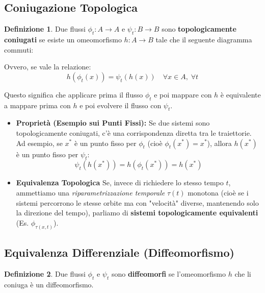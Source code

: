 \documentclass[openany]{book}
\theoremstyle{definition}
\newtheorem*{definizione}{Definizione}
\theoremstyle{remark}
\begin{document}
\subsection*{Coniugazione Topologica}
\begin{definizione}
Due flussi $\phi_t : A \to A$ e $\psi_t : B \to B$ sono \textbf{topologicamente coniugati} se esiste un omeomorfismo $h : A \to B$ tale che il seguente diagramma commuti:

\begin{center}
\end{center}

Ovvero, se vale la relazione:
\begin{equation}
h(\phi_t(x)) = \psi_t(h(x)) \quad \forall x \in A, \;\forall t
\end{equation}
\end{definizione}

Questo significa che applicare prima il flusso $\phi_t$ e poi mappare con $h$ è equivalente a mappare prima con $h$ e poi evolvere il flusso con $\psi_t$.

\begin{itemize}
    \item     \textbf{Proprietà (Esempio sui Punti Fissi):} Se due sistemi sono topologicamente coniugati, c'è una corrispondenza diretta tra le traiettorie. Ad esempio, se $x^*$ è un punto fisso per $\phi_t$ (cioè $\phi_t(x^*) = x^*$), allora $h(x^*)$ è un punto fisso per $\psi_t$:
\[
\psi_t(h(x^*)) = h(\phi_t(x^*)) = h(x^*)
\]

    \item   \textbf{Equivalenza Topologica}
    Se, invece di richiedere lo stesso tempo $t$, ammettiamo una \textit{riparametrizzazione temporale} $\tau(t)$ monotona (cioè se i sistemi percorrono le stesse orbite ma con "velocità" diverse, mantenendo solo la direzione del tempo), parliamo di \textbf{sistemi topologicamente equivalenti} (Es. $\phi_{\tau(x,t)}$).

\end{itemize}

\subsection*{Equivalenza Differenziale (Diffeomorfismo)}
\begin{definizione}
Due flussi $\phi_t$ e $\psi_t$ sono \textbf{diffeomorfi} se l'omeomorfismo $h$ che li coniuga è un diffeomorfismo.
\end{definizione}
\end{document}
